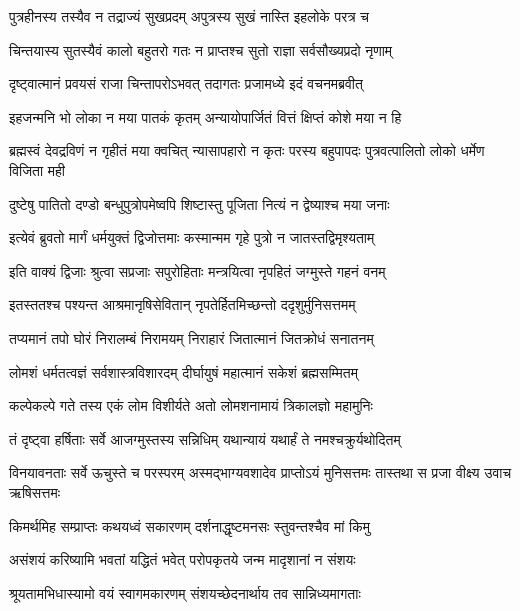 \twolineshloka
{पुत्रहीनस्य तस्यैव न तद्राज्यं सुखप्रदम्}
{अपुत्रस्य सुखं नास्ति इहलोके परत्र च}%

\twolineshloka
{चिन्तयास्य सुतस्यैवं कालो बहुतरो गतः}
{न प्राप्तश्च सुतो राज्ञा सर्वसौख्यप्रदो नृणाम्}%

\twolineshloka
{दृष्ट्वात्मानं प्रवयसं राजा चिन्तापरोऽभवत्}
{तदागतः प्रजामध्ये इदं वचनमब्रवीत्}%

\twolineshloka
{इहजन्मनि भो लोका न मया पातकं कृतम्}
{अन्यायोपार्जितं वित्तं क्षिप्तं कोशे मया न हि}%

\threelineshloka
{ब्रह्मस्वं देवद्रविणं न गृहीतं मया क्वचित्}
{न्यासापहारो न कृतः परस्य बहुपापदः}
{पुत्रवत्पालितो लोको धर्मेण विजिता मही}%

\twolineshloka
{दुष्टेषु पातितो दण्डो बन्धुपुत्रोपमेष्वपि}
{शिष्टास्तु पूजिता नित्यं न द्वेष्याश्च मया जनाः}%

\twolineshloka
{इत्येवं ब्रुवतो मार्गं धर्मयुक्तं द्विजोत्तमाः}
{कस्मान्मम गृहे पुत्रो न जातस्तद्विमृश्यताम्}%

\twolineshloka
{इति वाक्यं द्विजाः श्रुत्वा सप्रजाः सपुरोहिताः}
{मन्त्रयित्वा नृपहितं जग्मुस्ते गहनं वनम्}%

\twolineshloka
{इतस्ततश्च पश्यन्त आश्रमानृषिसेवितान्}
{नृपतेर्हितमिच्छन्तो ददृशुर्मुनिसत्तमम्}%

\twolineshloka
{तप्यमानं तपो घोरं निरालम्बं निरामयम्}
{निराहारं जितात्मानं जितक्रोधं सनातनम्}%

\twolineshloka
{लोमशं धर्मतत्वज्ञं सर्वशास्त्रविशारदम्}
{दीर्घायुषं महात्मानं सकेशं ब्रह्मसम्मितम्}%

\twolineshloka
{कल्पेकल्पे गते तस्य एकं लोम विशीर्यते}
{अतो लोमशनामायं त्रिकालज्ञो महामुनिः}%

\twolineshloka
{तं दृष्ट्वा हर्षिताः सर्वे आजग्मुस्तस्य सन्निधिम्}
{यथान्यायं यथार्हं ते नमश्चक्रुर्यथोदितम्}%

\threelineshloka
{विनयावनताः सर्वे ऊचुस्ते च परस्परम्}
{अस्मद्भाग्यवशादेव प्राप्तोऽयं मुनिसत्तमः}
{तास्तथा स प्रजा वीक्ष्य उवाच ऋषिसत्तमः}%


\twolineshloka
{किमर्थमिह सम्प्राप्तः कथयध्वं सकारणम्}
{दर्शनाद्धृष्टमनसः स्तुवन्तश्चैव मां किमु}%

\twolineshloka
{असंशयं करिष्यामि भवतां यद्धितं भवेत्}
{परोपकृतये जन्म मादृशानां न संशयः}%


\twolineshloka
{श्रूयतामभिधास्यामो वयं स्वागमकारणम्}
{संशयच्छेदनार्थाय तव सान्निध्यमागताः}%

